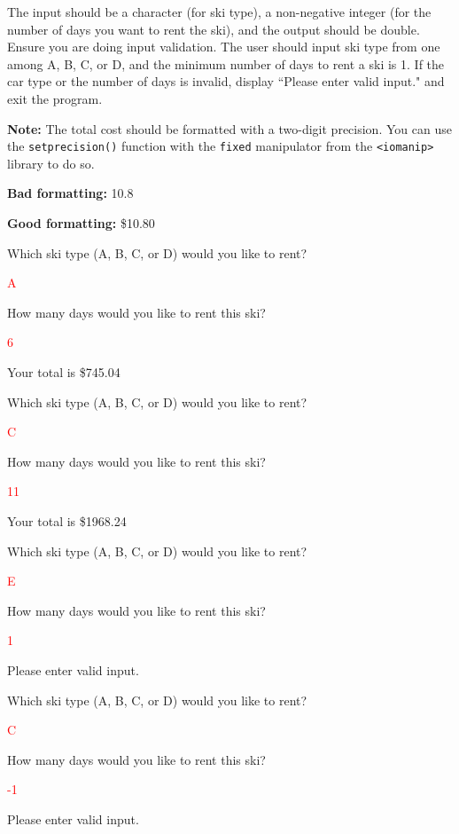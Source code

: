 The input should be a character (for ski type), a non-negative integer (for the number of days you want to rent the ski), and the output should be double. \\

Ensure you are doing input validation. The user should input ski type from one among A, B, C, or D, and the minimum number of days to rent a ski is 1. If the car type or the number of days is invalid, display ``Please enter valid input." and exit the program.

\hspace{1pt}

\textbf{Note:} The total cost should be formatted with a two-digit precision. You can use the \texttt{setprecision()} function with the \texttt{fixed} manipulator from the \texttt{<iomanip>} library to do so. 

\textbf{Bad formatting:} 10.8

\textbf{Good formatting:} \$10.80

\begin{sample}
Which ski type (A, B, C, or D) would you like to rent?

\textcolor{red}{A}

How many days would you like to rent this ski?

\textcolor{red}{6}

Your total is \$745.04
\end{sample}

\begin{sample}
Which ski type (A, B, C, or D) would you like to rent?

\textcolor{red}{C}

How many days would you like to rent this ski?

\textcolor{red}{11}

Your total is \$1968.24
\end{sample}

\begin{sample}
Which ski type (A, B, C, or D) would you like to rent?

\textcolor{red}{E}

How many days would you like to rent this ski?

\textcolor{red}{1}

Please enter valid input.
\end{sample}

\begin{sample}
Which ski type (A, B, C, or D) would you like to rent?

\textcolor{red}{C}

How many days would you like to rent this ski?

\textcolor{red}{-1}

Please enter valid input.
\end{sample}


